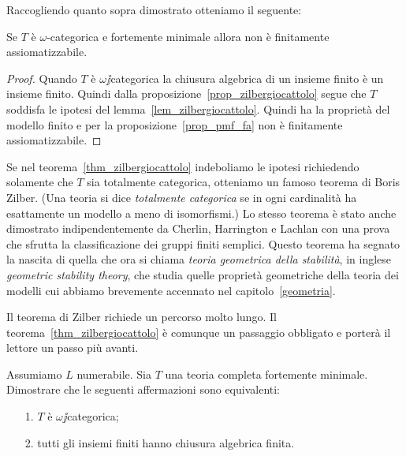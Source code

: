 Raccogliendo quanto sopra dimostrato otteniamo il seguente:

\begin{theorem}\label{thm_zilbergiocattolo}
Se $T$ \`e $\omega$-categorica e fortemente minimale allora non \`e finitamente assiomatizzabile.
\end{theorem}

\begin{proof}
Quando $T$ \`e $\omega\jj$categorica la chiusura algebrica di un insieme finito \`e un insieme finito. Quindi dalla proposizione~\ref{prop_zilbergiocattolo} segue che $T$ soddisfa le ipotesi del lemma~\ref{lem_zilbergiocattolo}. Quindi ha la propriet\`a del modello finito e per la proposizione~\ref{prop_pmf_fa} non \`e finitamente assiomatizzabile.
\end{proof}



Se nel teorema~\ref{thm_zilbergiocattolo} indeboliamo le ipotesi richiedendo solamente che $T$ sia totalmente categorica, otteniamo un famoso teorema di Boris Zilber. (Una teoria si dice \textit{totalmente categorica} se in ogni cardinalit\`a ha esattamente un modello a meno di isomorfismi.) Lo stesso teorema \`e stato anche dimostrato indipendentemente da Cherlin, Harrington e Lachlan con una prova che sfrutta la classificazione dei gruppi finiti semplici. Questo teorema ha segnato la nascita di quella che ora si chiama \textit{teoria geometrica della stabilit\`a}, in inglese \textit{geometric stability theory}, che studia quelle propriet\`a geometriche della teoria dei modelli cui abbiamo brevemente accennato nel capitolo~\ref{geometria}.

Il teorema di Zilber richiede un percorso molto lungo. Il teorema~\ref{thm_zilbergiocattolo} \`e comunque un  passaggio obbligato e porter\`a il lettore un passo pi\`u avanti.




\begin{exercise} 
Assumiamo $L$ numerabile. Sia $T$ una teoria completa fortemente minimale. Dimostrare che le seguenti affermazioni sono equivalenti:
\begin{itemize}
\item[1.]$T$ \`e $\omega\jj$categorica;
\item[2.] tutti gli insiemi finiti hanno chiusura algebrica finita.\QED
\end{itemize}
\end{exercise}


